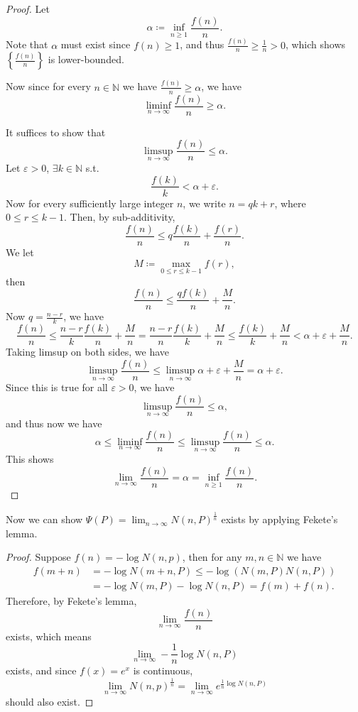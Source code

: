 \begin{proof}
    Let 
    \[
        \alpha \coloneqq \inf _{n \ge 1} \frac{f(n)}{n}.
    \]
    Note that \(\alpha \) must exist since \(f(n) \ge 1\), and thus \(\frac{f(n)}{n} \ge \frac{1}{n} > 0\), which shows \(\left\{ \frac{f(n)}{n} \right\} \) is lower-bounded. 
    
    Now since for every \(n \in \mathbb{N} \) we have \(\frac{f(n)}{n} \ge \alpha\), we have 
    \[
        \liminf_{n \to \infty} \frac{f(n)}{n} \ge \alpha.
    \]  

    It suffices to show that 
    \[
        \limsup_{n \to \infty} \frac{f(n)}{n} \le \alpha. 
    \]
    Let \(\varepsilon > 0\), \(\exists k \in \mathbb{N}\) s.t. 
    \[
        \frac{f(k)}{k} < \alpha + \varepsilon.
    \]  
    Now for every sufficiently large integer \(n\), we write \(n = qk + r\), where \(0 \le r \le k - 1\). Then, by sub-additivity,
    \[
        \frac{f(n)}{n} \le q \frac{f(k)}{n} + \frac{f(r)}{n}.
    \]
    We let 
    \[
        M \coloneqq \max _{0 \le r \le k - 1} f(r),
    \]  
    then 
    \[
        \frac{f(n)}{n} \le \frac{q f(k)}{n} + \frac{M}{n}.
    \]
    Now \(q = \frac{n - r}{k}\), we have 
    \[
        \frac{f(n)}{n} \le \frac{n - r}{k} \frac{f(k)}{n} + \frac{M}{n} = \frac{n - r}{n} \frac{f(k)}{k} + \frac{M}{n} \le \frac{f(k)}{k} + \frac{M}{n} < \alpha + \varepsilon + \frac{M}{n}.
    \] 
    Taking limsup on both sides, we have 
    \[
        \limsup_{n \to \infty} \frac{f(n)}{n} \le \limsup_{n \to \infty} \alpha + \varepsilon + \frac{M}{n} = \alpha + \varepsilon.  
    \]
    Since this is true for all \(\varepsilon > 0\), we have 
    \[
        \limsup_{n \to \infty} \frac{f(n)}{n} \le \alpha, 
    \] 
    and thus now we have 
    \[
        \alpha \le \liminf_{n \to \infty} \frac{f(n)}{n} \le \limsup_{n \to \infty} \frac{f(n)}{n} \le \alpha. 
    \]
    This shows 
    \[
        \lim_{n \to \infty} \frac{f(n)}{n} = \alpha = \inf _{n \ge 1} \frac{f(n)}{n}. 
    \]
\end{proof}

Now we can show \(\Psi (P) = \lim_{n \to \infty} N(n, P)^{\frac{1}{n}} \) exists by applying Fekete's lemma.

\begin{proof}
    Suppose \(f(n) = -\log N(n, p)\), then for any \(m, n \in \mathbb{N}\) we have
    \begin{align*}
        f(m + n) &= -\log N(m + n, P) \le - \log (N(m, P) N(n, P)) \\
        &= -\log N(m, P) - \log N(n, P) = f(m) + f(n).
    \end{align*} 
    Therefore, by Fekete's lemma, 
    \[
        \lim_{n \to \infty} \frac{f(n)}{n}
    \]
    exists, which means 
    \[
        \lim_{n \to \infty} -\frac{1}{n} \log N(n, P)
    \]
    exists, and since \(f(x) = e^x\) is continuous, 
    \[
        \lim_{n \to \infty} N(n, p)^{\frac{1}{n}} = \lim_{n \to \infty} e^{\frac{1}{n} \log N(n, P)} 
    \] 
    should also exist.
\end{proof}